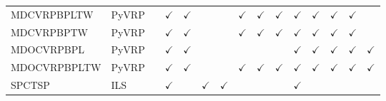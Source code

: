 \documentclass{article}
\theoremstyle{plain}
\theoremstyle{definition}
\theoremstyle{remark}
\begin{document}
\begin{table}[h!]
{\begin{tabular}{l|l|cc|cccccc|ccccc}
    MDCVRPBPLTW &PyVRP  & & $\checkmark$ & $\checkmark$ & & & $\checkmark$ & $\checkmark$ & $\checkmark$ & $\checkmark$ & $\checkmark$ & $\checkmark$ & $\checkmark$ & \\
    MDCVRPBPTW &PyVRP   & & $\checkmark$ & $\checkmark$ & & & $\checkmark$ & $\checkmark$ & $\checkmark$ & $\checkmark$ & $\checkmark$ & $\checkmark$ & $\checkmark$ & \\
    MDOCVRPBPL&PyVRP   & & $\checkmark$ & $\checkmark$ & & & & & & $\checkmark$ & $\checkmark$ & $\checkmark$ & $\checkmark$ & $\checkmark$ \\
    MDOCVRPBPLTW&PyVRP  & & $\checkmark$ & $\checkmark$ & & & $\checkmark$ & $\checkmark$ & $\checkmark$ & $\checkmark$ & $\checkmark$ & $\checkmark$ & $\checkmark$ & $\checkmark$ \\
    \midrule
    SPCTSP& ILS     & & $\checkmark$ & & $\checkmark$ & $\checkmark$ & & & & $\checkmark$ & & & & \\
    \bottomrule[0.5mm]
  \end{tabular}
  }
\end{table}
\end{document}
